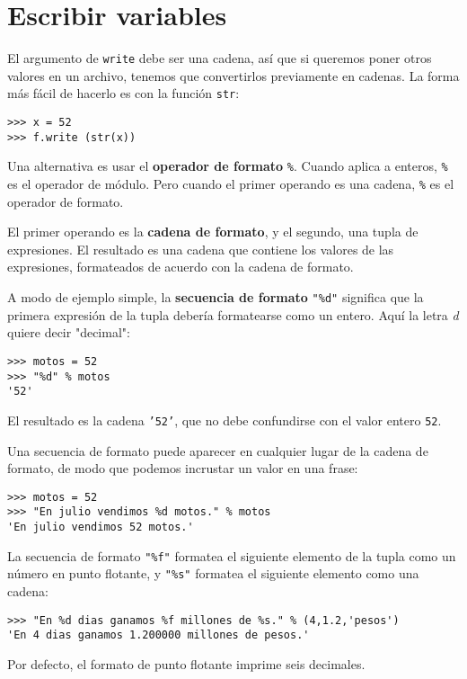 \section{Escribir variables}

El argumento de \texttt{write} debe ser una cadena, así que si queremos
poner otros valores en un archivo, tenemos que convertirlos previamente en
cadenas. La forma más fácil de hacerlo es con la función \texttt{str}:

\beforeverb
\begin{verbatim}
>>> x = 52
>>> f.write (str(x))
\end{verbatim}
\afterverb
%
Una alternativa es usar el {\bf operador de formato} \texttt{\%}. Cuando
aplica a enteros, \texttt{\%} es el operador de módulo. Pero cuando el
primer operando es una cadena, \texttt{\%} es el operador de formato.

El primer operando es la {\bf cadena de formato}, y el segundo,
una tupla de expresiones. El resultado es una cadena que contiene los
valores de las expresiones, formateados de acuerdo con la cadena de formato.

A modo de ejemplo simple, la {\bf secuencia de formato} {\verb+"%d"+}
significa que la primera expresión de la tupla debería formatearse como
un entero. Aquí la letra {\em d} quiere decir "decimal":

\beforeverb
\begin{verbatim}
>>> motos = 52
>>> "%d" % motos
'52'
\end{verbatim}
\afterverb
%
El resultado es la cadena \texttt{'52'}, que no debe confundirse con el valor
entero \texttt{52}.

Una secuencia de formato puede aparecer en cualquier lugar de la cadena de
formato, de modo que podemos incrustar un valor en una frase:

\beforeverb
\begin{verbatim}
>>> motos = 52
>>> "En julio vendimos %d motos." % motos
'En julio vendimos 52 motos.'
\end{verbatim}
\afterverb
%
La secuencia de formato {\verb+"%f"+} formatea el siguiente elemento
de la tupla como un número en punto flotante, y {\verb+"%s"+} formatea
el siguiente elemento como una cadena:

\beforeverb
\begin{verbatim}
>>> "En %d dias ganamos %f millones de %s." % (4,1.2,'pesos')
'En 4 dias ganamos 1.200000 millones de pesos.'
\end{verbatim}
\afterverb
%
Por defecto, el formato de punto flotante imprime seis decimales.

